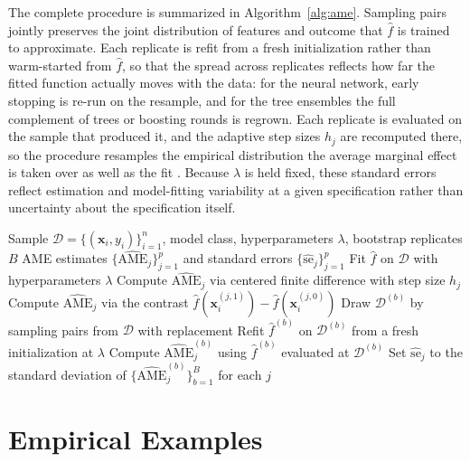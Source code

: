 \documentclass[conference]{IEEEtran}
\begin{document}
	The complete procedure is summarized in Algorithm~\ref{alg:ame}. Sampling pairs jointly preserves the joint distribution of features and outcome that $\hat{f}$ is trained to approximate. Each replicate is refit from a fresh initialization rather than warm-started from $\hat{f}$, so that the spread across replicates reflects how far the fitted function actually moves with the data: for the neural network, early stopping is re-run on the resample, and for the tree ensembles the full complement of trees or boosting rounds is regrown. Each replicate is evaluated on the sample that produced it, and the adaptive step sizes $h_j$ are recomputed there, so the procedure resamples the empirical distribution the average marginal effect is taken over as well as the fit \cite{efrontibshirani1993}. Because $\lambda$ is held fixed, these standard errors reflect estimation and model-fitting variability at a given specification rather than uncertainty about the specification itself.
	
	\begin{algorithm}
		\caption{AME estimation with bootstrap inference}
		\label{alg:ame}
		\begin{algorithmic}[1]
			\Require Sample $\mathcal{D} = \{(\mathbf{x}_i, y_i)\}_{i=1}^n$, model class, hyperparameters $\lambda$, bootstrap replicates $B$
			\Ensure AME estimates $\{\widehat{\mathrm{AME}}_j\}_{j=1}^p$ and standard errors $\{\widehat{\mathrm{se}}_j\}_{j=1}^p$
			\State Fit $\hat{f}$ on $\mathcal{D}$ with hyperparameters $\lambda$
			\State Compute $\widehat{\mathrm{AME}}_j$ via centered finite difference with step size $h_j$
			\Else
			\State Compute $\widehat{\mathrm{AME}}_j$ via the contrast $\hat{f}(\mathbf{x}_i^{(j,1)}) - \hat{f}(\mathbf{x}_i^{(j,0)})$
			\EndIf
			\EndFor
			\State Draw $\mathcal{D}^{(b)}$ by sampling pairs from $\mathcal{D}$ with replacement
			\State Refit $\hat{f}^{(b)}$ on $\mathcal{D}^{(b)}$ from a fresh initialization at $\lambda$
			\State Compute $\widehat{\mathrm{AME}}_j^{(b)}$ using $\hat{f}^{(b)}$ evaluated at $\mathcal{D}^{(b)}$
			\EndFor
			\EndFor
			\State Set $\widehat{\mathrm{se}}_j$ to the standard deviation of $\{\widehat{\mathrm{AME}}_j^{(b)}\}_{b=1}^B$ for each $j$
		\end{algorithmic}
	\end{algorithm}
	
	\section{Empirical Examples}
	
\end{document}
